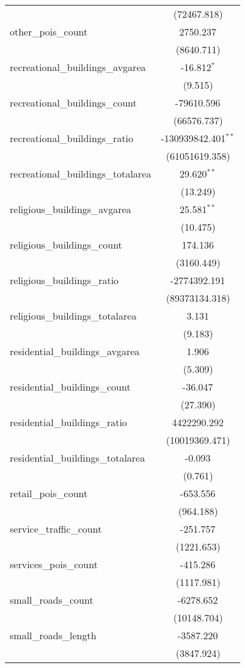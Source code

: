 \begin{table}[!htbp]
\begin{tabular}{@{\extracolsep{5pt}}lc}
  & (72467.818) \\
 other_pois_count & 2750.237$^{}$ \\
  & (8640.711) \\
 recreational_buildings_avgarea & -16.812$^{*}$ \\
  & (9.515) \\
 recreational_buildings_count & -79610.596$^{}$ \\
  & (66576.737) \\
 recreational_buildings_ratio & -130939842.401$^{**}$ \\
  & (61051619.358) \\
 recreational_buildings_totalarea & 29.620$^{**}$ \\
  & (13.249) \\
 religious_buildings_avgarea & 25.581$^{**}$ \\
  & (10.475) \\
 religious_buildings_count & 174.136$^{}$ \\
  & (3160.449) \\
 religious_buildings_ratio & -2774392.191$^{}$ \\
  & (89373134.318) \\
 religious_buildings_totalarea & 3.131$^{}$ \\
  & (9.183) \\
 residential_buildings_avgarea & 1.906$^{}$ \\
  & (5.309) \\
 residential_buildings_count & -36.047$^{}$ \\
  & (27.390) \\
 residential_buildings_ratio & 4422290.292$^{}$ \\
  & (10019369.471) \\
 residential_buildings_totalarea & -0.093$^{}$ \\
  & (0.761) \\
 retail_pois_count & -653.556$^{}$ \\
  & (964.188) \\
 service_traffic_count & -251.757$^{}$ \\
  & (1221.653) \\
 services_pois_count & -415.286$^{}$ \\
  & (1117.981) \\
 small_roads_count & -6278.652$^{}$ \\
  & (10148.704) \\
 small_roads_length & -3587.220$^{}$ \\
  & (3847.924) \\

\end{tabular}
\end{table}
